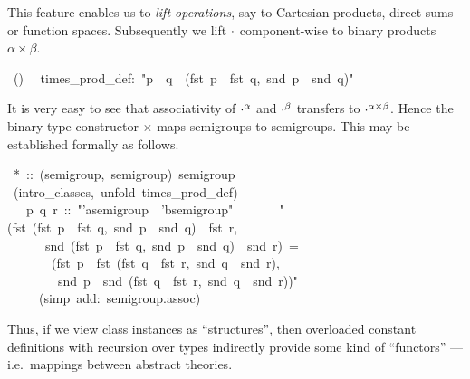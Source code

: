 \begin{isabelle}
\begin{isamarkuptext}
 This feature enables us to \emph{lift operations}, say to Cartesian
 products, direct sums or function spaces.  Subsequently we lift
 $\cdot$ component-wise to binary products $\alpha \times \beta$.%
\end{isamarkuptext}%
\ ()\isanewline
\ \ times\_prod\_def:\ {"}p\ {\isasymOtimes}\ q\ {\isasymequiv}\ (fst\ p\ {\isasymOtimes}\ fst\ q,\ snd\ p\ {\isasymOtimes}\ snd\ q){"}%
\begin{isamarkuptext}%
It is very easy to see that associativity of $\cdot^\alpha$ and
 $\cdot^\beta$ transfers to ${\cdot}^{\alpha \times \beta}$.  Hence
 the binary type constructor $\times$ maps semigroups to semigroups.
 This may be established formally as follows.%
\end{isamarkuptext}%
\ *\ ::\ (semigroup,\ semigroup)\ semigroup\isanewline
{}\ (intro\_classes,\ unfold\ times\_prod\_def)\isanewline
\ \ \ p\ q\ r\ ::\ {"}'a{\isasymColon}semigroup\ {\isasymtimes}\ 'b{\isasymColon}semigroup{"}\isanewline
\ \ \isanewline
\ \ \ \ {"}(fst\ (fst\ p\ {\isasymOtimes}\ fst\ q,\ snd\ p\ {\isasymOtimes}\ snd\ q)\ {\isasymOtimes}\ fst\ r,\isanewline
\ \ \ \ \ \ snd\ (fst\ p\ {\isasymOtimes}\ fst\ q,\ snd\ p\ {\isasymOtimes}\ snd\ q)\ {\isasymOtimes}\ snd\ r)\ =\isanewline
\ \ \ \ \ \ \ (fst\ p\ {\isasymOtimes}\ fst\ (fst\ q\ {\isasymOtimes}\ fst\ r,\ snd\ q\ {\isasymOtimes}\ snd\ r),\isanewline
\ \ \ \ \ \ \ \ snd\ p\ {\isasymOtimes}\ snd\ (fst\ q\ {\isasymOtimes}\ fst\ r,\ snd\ q\ {\isasymOtimes}\ snd\ r)){"}\isanewline
\ \ \ \ \ (simp\ add:\ semigroup.assoc)\isanewline
{}%
\begin{isamarkuptext}%
Thus, if we view class instances as ``structures'', then overloaded
 constant definitions with recursion over types indirectly provide
 some kind of ``functors'' --- i.e.\ mappings between abstract
 theories.%
\end{isamarkuptext}%
\end{isabelle}%
